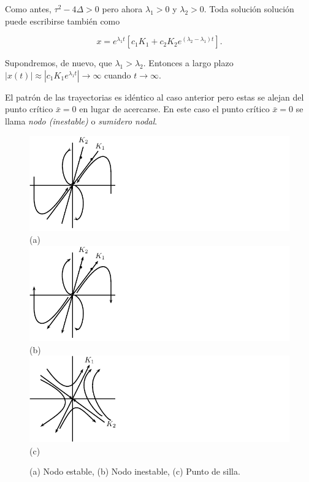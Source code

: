 \documentclass[11pt]{book}
\theoremstyle{definition}
\numberwithin{definition}{section}
\theoremstyle{theorem}
\numberwithin{theorem}{section}
\numberwithin{lemma}{section}
\numberwithin{corollary}{section}
\theoremstyle{plain}
\numberwithin{example}{section}
\begin{document}
Como antes, $\tau^2 - 4\Delta > 0$ pero ahora $\lambda_1 > 0$ y $\lambda_2 > 0$.
Toda solución solución puede escribirse también como

$$ x = e^{\lambda_1 t} [ c_1 K_1 + c_2K_2 e^{(\lambda_2 - \lambda_1)t} ].$$

Supondremos, de nuevo, que $\lambda_1 > \lambda_2$. Entonces a largo plazo $|x(t)| \approx |c_1 K_1 e^{\lambda_1 t}| \to \infty$ cuando $t \to \infty$.

El patrón de las trayectorias es idéntico al caso anterior pero estas se alejan del punto crítico $\bar{x} = 0$ en lugar de acercarse. En este caso el punto crítico $\bar{x} = 0$ se llama \emph{nodo (inestable)} o \emph{sumidero nodal}.

\begin{figure}[!ht] \label{fig:nodos} \centering
    \includegraphics[scale=1.0]{figures/nodoestable.pdf}\\(a)\\
    \includegraphics[scale=1.0]{figures/nodoinestable.pdf}\\(b)\\
    \includegraphics[scale=1.0]{figures/puntodesilla.pdf}\\(c)\\
    \caption{(a) Nodo estable, (b) Nodo inestable, (c) Punto de silla.}
\end{figure}
\end{document}
